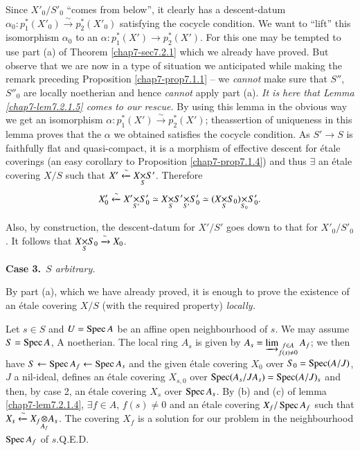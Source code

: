Since $X'_{0}/S'_{0}$ ``comes from below'', it clearly has a
descent-datum
$\alpha_{0}:p^{\ast}_{1}(X'_{0})\xrightarrow{\sim}p^{\ast}_{2}(X'_{0})$
satisfying the cocycle condition. We want to ``lift'' this isomorphism
$\alpha_{0}$ to an $\alpha:p^{\ast}_{1}(X')\to p^{\ast}_{2}(X')$. For
this one may be tempted to use part (a) of Theorem \ref{chap7-sec7.2.1}
which we already have proved. But observe that we are now in a type of
situation we anticipated while making the remark preceding Proposition
\ref{chap7-prop7.1.1} -- we {\em cannot} make sure that $S''$, $S''_{0}$ are
locally noetherian and hence {\em cannot} apply part (a). {\em It is
  here that Lemma \ref{chap7-lem7.2.1.5} comes to our rescue.} By using this
lemma in the obvious way we get an isomorphism
$\alpha:p^{\ast}_{1}(X')\xrightarrow{\sim}p^{\ast}_{2}(X')$;
the\pageoriginale assertion of uniqueness in this lemma proves that
the $\alpha$ we obtained satisfies the cocycle condition. As $S'\to S$
is faithfully flat and quasi-compact, it is a morphism of effective
descent for \'etale coverings (an easy corollary to Proposition
\ref{chap7-prop7.1.4}) and thus $\exists$ an \'etale covering $X/S$ such
that $X'\xleftarrow{\sim}\fprod{X}{S'}{S}$. Therefore
$$
X'_{0}\xleftarrow{\sim} \fprod{X'}{S'_{0}}{S'}\simeq
\fprod{X}{\fprod{S'}{S'_{0}}{S'}}{S}\simeq
\fprod{(\fprod{X}{S_{0}}{S})}{S'_{0}}{S_{0}}. 
$$

Also, by construction, the descent-datum for $X'/S'$ goes down to that
for $X'_{0}/S'_{0}$. It follows that
$\fprod{X}{S_{0}}{S}\xrightarrow{\sim}X_{0}$. 

\medskip
\noindent
{\bf Case 3.}~{\em $S$ arbitrary.}
\smallskip

By part (a), which we have already proved, it is enough to prove the
existence of an \'etale covering $X/S$ (with the required property)
{\em locally.}

Let $s\in S$ and $U=\operatorname{Spec} A$ be an affine open neighbourhood of
$s$. We may assume $S=\operatorname{Spec} A$, A noetherian. The local ring $A_{s}$
is given by $A_{s}=\varinjlim_{\substack{f\in A\\ f(s)\neq 0}}
A_{f}$; we then have $S\leftarrow \operatorname{Spec} A_{f}\leftarrow \operatorname{Spec} A_{s}$
and the given \'etale covering $X_{0}$ over $S_{0}=\operatorname{Spec} (A/J)$, $J$ a
nil-ideal, defines an \'etale covering $X_{s,0}$ over $\operatorname{Spec}
(A_{s}/JA_{s})=\operatorname{Spec} (A/J)_{s}$ and then, by case 2, an \'etale
covering $X_{s}$ over $\operatorname{Spec} A_{s}$. By (b) and (c) of lemma
\ref{chap7-lem7.2.1.4}, $\exists f\in A$, $f(s)\neq 0$ and an \'etale
covering $X_{f}/\operatorname{Spec} A_{f}$ such that
$X_{s}\xleftarrow{\sim}\foprod{X_{f}}{A_{s}}{A_{f}}$. The\pageoriginale
covering $X_{f}$ is a solution for our problem in the neighbourhood
$\operatorname{Spec} A_{f}$ of $s$.\hfill Q.E.D.

